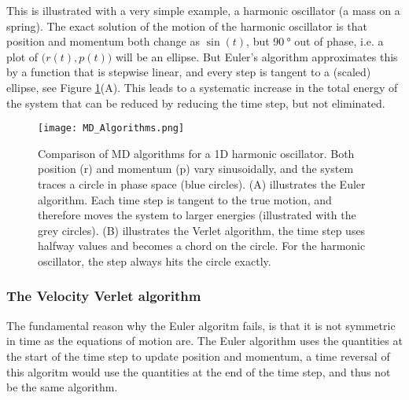\documentclass[a4paper,11pt]{article}
\begin{document}
This is illustrated with a very simple example, a harmonic oscillator
(a mass on a spring).  The exact solution of the motion of the
harmonic oscillator is that position and momentum both change as
$\sin(t)$, but $\SI{90}{\degree}$ out of phase, i.e. a plot of
$\bigl( r(t), p(t) \bigr)$ will be an ellipse.  But Euler's algorithm
approximates this by a function that is stepwise linear, and every
step is tangent to a (scaled) ellipse, see Figure
\ref{fig:algorithms}(A).  This leads to a systematic increase in the
total energy of the system that can be reduced by reducing the time
step, but not eliminated.
\begin{figure}
  \centering
  \texttt{[image: MD\_Algorithms.png]}
  \caption{Comparison of MD algorithms for a 1D harmonic oscillator.
    Both position (r) and momentum (p) vary sinusoidally, and the
    system traces a circle in phase space (blue circles). (A)
    illustrates the Euler algorithm.  Each time step is tangent to the
    true motion, and therefore moves the system to larger energies
    (illustrated with the grey circles).  (B) illustrates the Verlet
    algorithm, the time step uses halfway values and becomes a chord
    on the circle.  For the harmonic oscillator, the step always hits
    the circle exactly.}
  \label{fig:algorithms}
\end{figure}

\subsubsection{The Velocity Verlet algorithm}
\label{sec:veloc-verl-algor}

The fundamental reason why the Euler algoritm fails, is that it is not
symmetric in time as the equations of motion are.  The Euler algorithm
uses the quantities at the start of the time step to update position
and momentum, a time reversal of this algoritm would use the
quantities at the end of the time step, and thus not be the same
algorithm.
\end{document}
